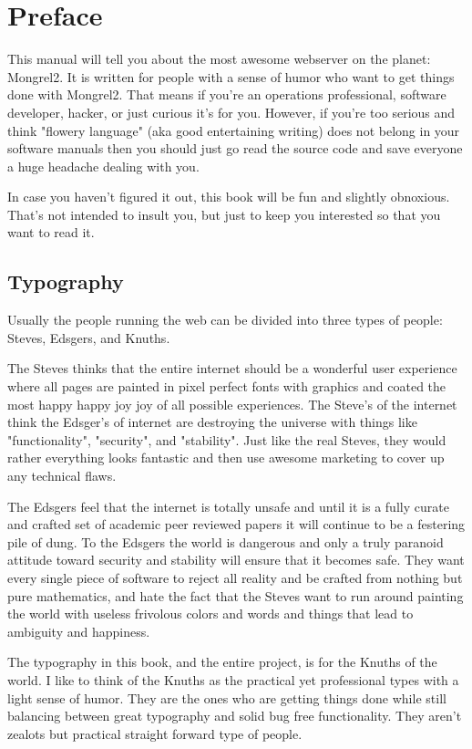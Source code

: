 \chapter*{Preface}

This manual will tell you about the most awesome webserver on the planet: Mongrel2.
It is written for people with a sense of humor who want to get things done with Mongrel2.
That means if you're an operations professional, software developer, hacker, or just
curious it's for you.  However, if you're too serious and think "flowery language"
(aka good entertaining writing) does not belong in your software manuals then you should just
go read the source code and save everyone a huge headache dealing with you.

In case you haven't figured it out, this book will be fun and slightly obnoxious.  That's
not intended to insult you, but just to keep you interested so that you want to read it.


\section*{Typography}

Usually the people running the web can be divided into three types of people:  Steves,
Edsgers, and Knuths.

The Steves thinks that the entire internet should be a wonderful user experience
where all pages are painted in pixel perfect fonts with graphics and coated the most happy happy joy
joy of all possible experiences.  The Steve's of the internet think the Edsger's of internet 
are destroying the universe with things like "functionality", "security", and "stability".  Just like
the real Steves, they would rather everything looks fantastic and then use awesome marketing
to cover up any technical flaws.

The Edsgers feel that the internet is totally unsafe and until it is a fully curate and crafted
set of academic peer reviewed papers it will continue to be a festering pile of dung.  To the Edsgers
the world is dangerous and only a truly paranoid attitude toward security and stability will ensure
that it becomes safe.  They want every single piece of software to reject all reality and be crafted
from nothing but pure mathematics, and hate the fact that the Steves want to run around painting
the world with useless frivolous colors and words and things that lead to ambiguity and happiness.

The typography in this book, and the entire project, is for the Knuths of the world.  I like to think
of the Knuths as the practical yet professional types with a light sense of humor.  They are the ones
who are getting things done while still balancing between great typography and solid bug free functionality.
They aren't zealots but practical straight forward type of people.

